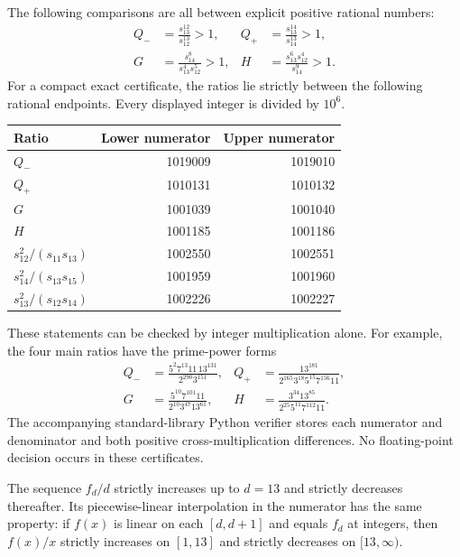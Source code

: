 The following comparisons are all between explicit positive rational
numbers:
\begin{align}
 Q_-&=\frac{s_{13}^{12}}{s_{12}^{13}}>1,
 &Q_+&=\frac{s_{13}^{14}}{s_{14}^{13}}>1,
 \label{eq:proj-peak-checks}\\
 G&=\frac{s_{14}^{8}}{s_{13}^{4}s_{12}^{5}}>1,
 &H&=\frac{s_{13}^{6}s_{12}^{4}}{s_{14}^{9}}>1.
 \label{eq:proj-branch-checks}
\end{align}
For a compact exact certificate, the ratios lie strictly between the
following rational endpoints. Every displayed integer is divided by
$10^6$.
\begin{center}
\begin{tabular}{lrr}
\toprule
Ratio & Lower numerator & Upper numerator\\
\midrule
$Q_-$ & 1019009 & 1019010\\
$Q_+$ & 1010131 & 1010132\\
$G$   & 1001039 & 1001040\\
$H$   & 1001185 & 1001186\\
$s_{12}^2/(s_{11}s_{13})$ & 1002550 & 1002551\\
$s_{14}^2/(s_{13}s_{15})$ & 1001959 & 1001960\\
$s_{13}^2/(s_{12}s_{14})$ & 1002226 & 1002227\\
\bottomrule
\end{tabular}
\end{center}
These statements can be checked by integer multiplication alone. For
example, the four main ratios have the prime-power forms
\begin{align*}
 Q_-&=\frac{5^2 7^{13}11\,13^{131}}{2^{290}3^{151}},
 &Q_+&=\frac{13^{181}}{2^{165}3^{18}5^{15}7^{156}11},\\
 G&=\frac{5^{10}7^{101}11}{2^{10}3^{47}13^{61}},
 &H&=\frac{3^{34}13^{85}}{2^{25}5^{11}7^{112}11}.
\end{align*}
The accompanying standard-library Python verifier stores each numerator
and denominator and both positive cross-multiplication differences. No
floating-point decision occurs in these certificates.

\begin{lemma}\label{lem:proj-peak}
The sequence $f_d/d$ strictly increases up to $d=13$ and strictly
decreases thereafter. Its piecewise-linear interpolation in the
numerator has the same property: if $f(x)$ is linear on each
$[d,d+1]$ and equals $f_d$ at integers, then $f(x)/x$ strictly increases
on $[1,13]$ and strictly decreases on $[13,\infty)$.
\end{lemma}

